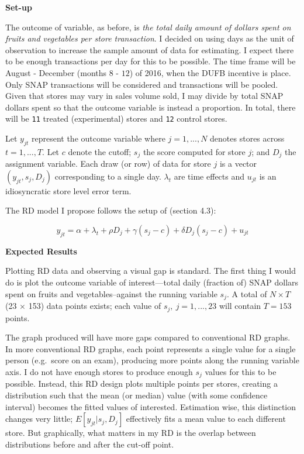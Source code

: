 \documentclass[12pt,letterpaperpaper,]{book}
\begin{document}
\textbf{Set-up}

The outcome of variable, as before, is \emph{the total daily amount of
dollars spent on fruits and vegetables per store transaction}. I decided
on using days as the unit of observation to increase the sample amount
of data for estimating. I expect there to be enough transactions per day
for this to be possible. The time frame will be August - December
(months \(8\) - \(12\)) of 2016, when the DUFB incentive is place. Only
SNAP transactions will be considered and transactions will be pooled.
Given that stores may vary in sales volume sold, I may divide by total
SNAP dollars spent so that the outcome variable is instead a proportion.
In total, there will be \texttt{11} treated (experimental) stores and
\texttt{12} control stores.

Let \(y_{jt}\) represent the outcome variable where \(j=1,...,N\)
denotes stores across \(t=1,...,T\). Let \(c\) denote the cutoff;
\(s_{j}\) the score computed for store \(j\); and \(D_{j}\) the
assignment variable. Each draw (or row) of data for store \(j\) is a
vector \((y_{jt}, s_{j}, D_{j})\) corresponding to a single day.
\(\lambda_t\) are time effects and \(u_{jt}\) is an idiosyncratic store
level error term.

The RD model I propose follows the setup of \citet{lee_regression_2010}
(section 4.3):

\[y_{jt} = \alpha + \lambda_t + \rho D_{j} + \gamma (s_{j} - c) + \delta D_{j}(s_{j} - c) + u_{jt}\]

\textbf{Expected Results}

Plotting RD data and observing a visual gap is standard. The first thing
I would do is plot the outcome variable of interest---total daily
(fraction of) SNAP dollars spent on fruits and vegetables--against the
running variable \(s_j\). A total of \(N \times T\) (23 \(\times\) 153)
data points exists; each value of \(s_j,~j=1,...,23\) will contain
\(T=153\) points.

The graph produced will have more gaps compared to conventional RD
graphs. In more conventional RD graphs, each point represents a single
value for a single person (e.g.~score on an exam), producing more points
along the running variable axis. I do not have enough stores to produce
enough \(s_j\) values for this to be possible. Instead, this RD design
plots multiple points per stores, creating a distribution such that the
mean (or median) value (with some confidence interval) becomes the
fitted values of interested. Estimation wise, this distinction changes
very little; \(E[y_{jt}|s_{j}, D_{j}]\) effectively fits a mean value to
each different store. But graphically, what matters in my RD is the
overlap between distributions before and after the cut-off point.
\end{document}
